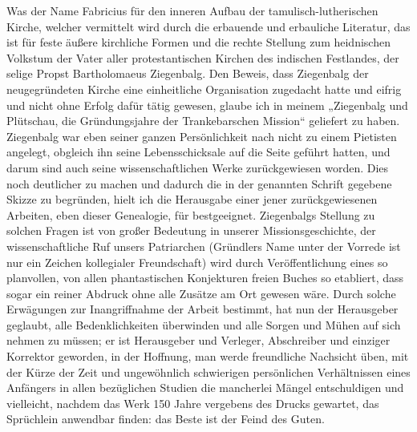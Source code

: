 \documentclass{article}
\begin{document}
Was der Name Fabricius für den inneren Aufbau der tamulisch-lutherischen Kirche, welcher vermittelt wird durch die erbauende und erbauliche Literatur, das ist für feste äußere kirchliche Formen und die rechte Stellung zum heidnischen Volkstum der Vater aller protestantischen Kirchen des indischen Festlandes, der selige Propst Bartholomaeus Ziegenbalg. Den Beweis, dass Ziegenbalg der neugegründeten Kirche eine einheitliche Organisation zugedacht hatte und eifrig und nicht ohne Erfolg dafür tätig gewesen, glaube ich in meinem „Ziegenbalg und Plütschau, die Gründungsjahre der Trankebarschen Mission“ geliefert zu haben. Ziegenbalg war eben seiner ganzen Persönlichkeit nach nicht zu einem Pietisten angelegt, obgleich ihn seine Lebensschicksale auf die Seite geführt hatten, und darum sind auch seine wissenschaftlichen Werke zurückgewiesen worden. Dies noch deutlicher zu machen und dadurch die in der genannten Schrift gegebene Skizze zu begründen, hielt ich die Herausgabe einer jener zurückgewiesenen Arbeiten, eben dieser Genealogie, für bestgeeignet. Ziegenbalgs Stellung zu solchen Fragen ist von großer Bedeutung in unserer Missionsgeschichte, der wissenschaftliche Ruf unsers Patriarchen (Gründlers Name unter der Vorrede ist nur ein Zeichen kollegialer Freundschaft) wird durch Veröffentlichung eines so planvollen, von allen phantastischen Konjekturen freien Buches so etabliert, dass sogar ein reiner Abdruck ohne alle Zusätze am Ort gewesen wäre. Durch solche Erwägungen zur Inangriffnahme der Arbeit bestimmt, hat nun der Herausgeber geglaubt, alle Bedenklichkeiten überwinden und alle Sorgen und Mühen auf sich nehmen zu müssen; er ist Herausgeber und Verleger, Abschreiber und einziger Korrektor geworden, in der Hoffnung, man werde freundliche Nachsicht üben, mit der Kürze der Zeit und ungewöhnlich schwierigen persönlichen Verhältnissen eines Anfängers in allen bezüglichen Studien die mancherlei Mängel entschuldigen und vielleicht, nachdem das Werk 150 Jahre vergebens des Drucks gewartet, das Sprüchlein anwendbar finden: das Beste ist der Feind des Guten.
\end{document}
